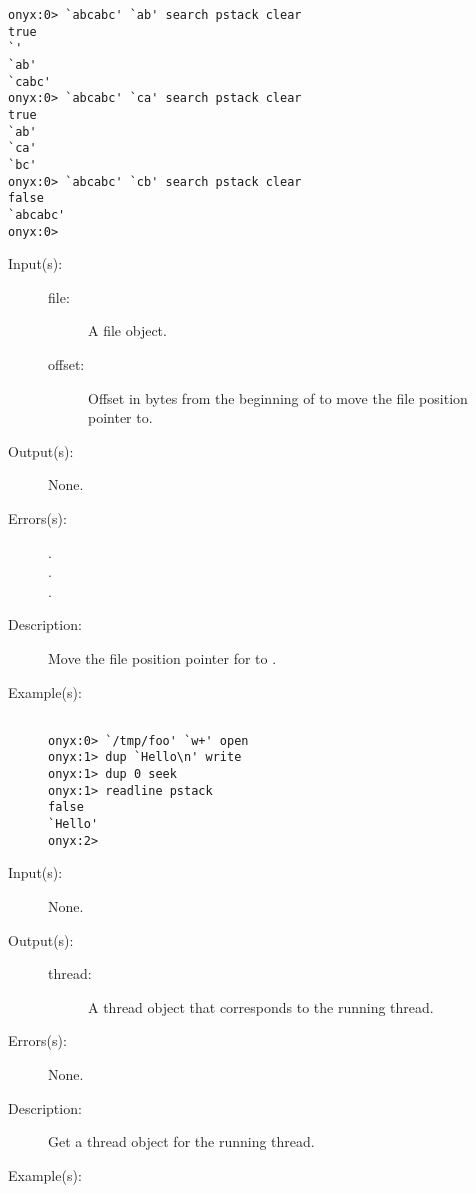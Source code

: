 \begin{description}
\begin{description}
\begin{verbatim}
onyx:0> `abcabc' `ab' search pstack clear
true
`'
`ab'
`cabc'
onyx:0> `abcabc' `ca' search pstack clear
true
`ab'
`ca'
`bc'
onyx:0> `abcabc' `cb' search pstack clear
false
`abcabc'
onyx:0>
		\end{verbatim}
	\end{description}
\label{systemdict:seek}
\item[{\onyxop{file offset}{seek}{--}}: ]
	\begin{description}\item[]
	\item[Input(s): ]
		\begin{description}\item[]
		\item[file: ]
			A file object.
		\item[offset: ]
			Offset in bytes from the beginning of 
			to move the file position pointer to.
		\end{description}
	\item[Output(s): ] None.
	\item[Errors(s): ]
		\begin{description}\item[]
		\item[.]
		\item[.]
		\item[.]
		\end{description}
	\item[Description: ]
		Move the file position pointer for  to
		.
	\item[Example(s): ]\begin{verbatim}

onyx:0> `/tmp/foo' `w+' open
onyx:1> dup `Hello\n' write
onyx:1> dup 0 seek
onyx:1> readline pstack
false
`Hello'
onyx:2>
		\end{verbatim}
	\end{description}
\label{systemdict:self}
\item[{\onyxop{--}{self}{thread}}: ]
	\begin{description}\item[]
	\item[Input(s): ] None.
	\item[Output(s): ]
		\begin{description}\item[]
		\item[thread: ]
			A thread object that corresponds to the running thread.
		\end{description}
	\item[Errors(s): ] None.
	\item[Description: ]
		Get a thread object for the running thread.
	\item[Example(s): ]\begin{verbatim}


\end{verbatim}
\end{description}
\end{description}
